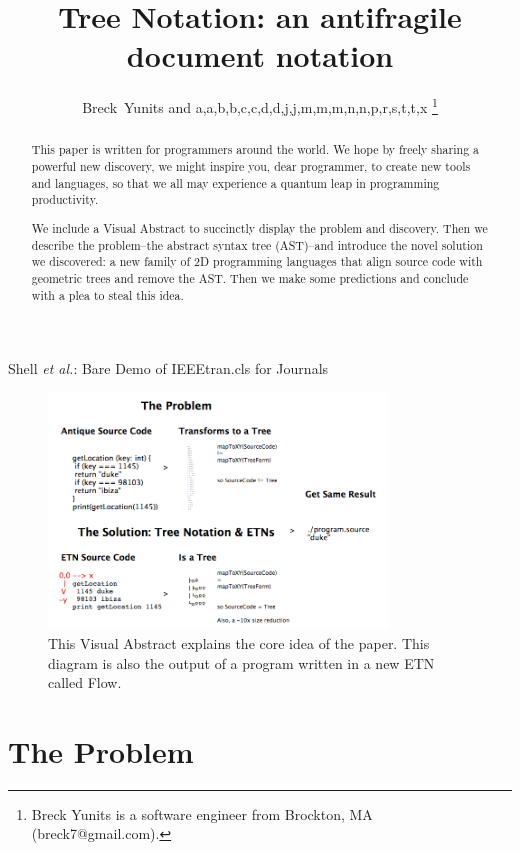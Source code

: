 \documentclass[journal]{IEEEtran}
\begin{document}
\title{Tree Notation: an antifragile document notation}

\author{Breck~Yunits and a,a,b,b,c,c,d,d,j,j,m,m,m,n,n,p,r,s,t,t,x%
\thanks{Breck Yunits is a software engineer from Brockton, MA (breck7@gmail.com).}%
}

%
{Shell \MakeLowercase{\textit{et al.}}: Bare Demo of IEEEtran.cls for Journals}

\maketitle


\begin{abstract}
This paper is written for programmers around the world. We hope by freely sharing a powerful new discovery, we might inspire you, dear programmer, to create new tools and languages, so that we all may experience a quantum leap in programming productivity.

We include a Visual Abstract to succinctly display the problem and discovery. Then we describe the problem--the abstract syntax tree (AST)--and introduce the novel solution we discovered: a new family of 2D programming languages that align source code with geometric trees and remove the AST. Then we make some predictions and conclude with a plea to steal this idea.
\end{abstract}

\IEEEpeerreviewmaketitle

\begin{figure}[ht!]
\centering
\includegraphics[width=90mm]{treenotation.png}
\caption{This Visual Abstract explains the core idea of the paper. This diagram is also the output of a program written in a new ETN called Flow.}
\end{figure}

\section{The Problem}
\end{document}
